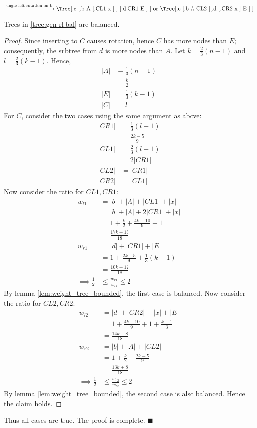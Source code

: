 \documentclass[12pt]{article}
\begin{document}
\begin{enumerate}
\begin{description}
\begin{equation}\label{tree:gen-rl-bal}
\xrightarrow{\text{single left rotation on b}}
	\text{\Tree[.c [.b A [.CL1 x ] ] [.d CR1 E ] ]} \text{ or }
	\text{\Tree[.c [.b A CL2 ] [.d [.CR2 x ] E ] ]}
\end{equation}

\begin{claim}
Trees in \ref{tree:gen-rl-bal} are balanced.
\end{claim}

\begin{proof}
Since inserting to $C$ causes rotation, hence $C$ has more nodes than $E$; consequently, the subtree from $d$ is more nodes than $A$. 
Let $k = \frac{2}{3}(n-1)$ and $l = \frac{2}{3}(k-1)$. Hence,
\begin{align*}
|A| &= \frac{1}{3}(n-1)\\
	&= \frac{k}{2}\\
|E| &= \frac{1}{3}(k-1)\\
|C| &= l
\end{align*}
For $C$, consider the two cases using the same argument as above:
\begin{align*}
|CR1| &= \frac{1}{3}(l-1)\\
	&= \frac{2k-5}{9}\\
|CL1| &= \frac{2}{3}(l-1)\\
	&= 2|CR1|\\
|CL2| &= |CR1|\\
|CR2| &= |CL1|
\end{align*}
Now consider the ratio for $CL1, CR1$:
\begin{align*}
w_{l1} &= |b| + |A| + |CL1| + |x|\\
	&= |b| + |A| + 2|CR1| + |x|\\
	&= 1 + \frac{k}{2} + \frac{4k-10}{9} + 1\\
	&= \frac{17k+16}{18}\\
w_{r1} &= |d| + |CR1| + |E|\\
	&= 1 + \frac{2k-5}{9} + \frac{1}{3}(k-1)\\
	&= \frac{10k+12}{18}\\
\implies \frac{1}{2} &\le \frac{w_{r1}}{w_{l1}} \le 2
\end{align*}
By lemma \ref{lem:weight_tree_bounded}, the first case is balanced. Now consider the ratio for $CL2, CR2$:
\begin{align*}
w_{l2} &= |d| + |CR2| + |x| + |E|\\
	&= 1 + \frac{4k-10}{9} + 1 + \frac{k-1}{3}\\
	&= \frac{14k-8}{18}\\
w_{r2} &= |b| + |A| + |CL2|\\
	&= 1 + \frac{k}{2} + \frac{2k-5}{9}\\
	&= \frac{13k+8}{18}\\
\implies \frac{1}{2} &\le \frac{w_{r2}}{w_{l2}} \le 2
\end{align*}
By lemma \ref{lem:weight_tree_bounded}, the second case is also balanced. Hence the claim holds.
\end{proof}
\end{description}
\end{enumerate}
Thus all cases are true.
The proof is complete.
\hfill $\blacksquare$
\end{document}
